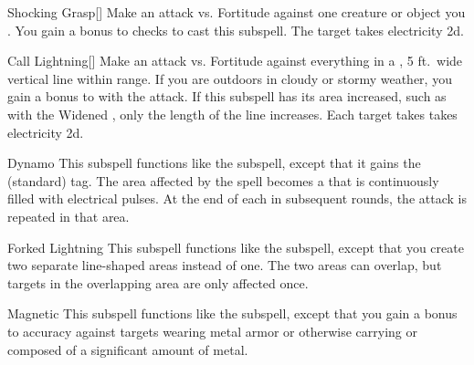 \begin{ability}[\nth{1}]{Shocking Grasp}[]
Make an attack vs. Fortitude against one creature or object you .
You gain a  bonus to  checks to cast this subspell.
\hit The target takes electricity  \plus2d.
\end{ability}
\vspace{0.25em}



\begin{ability}[\nth{2}]{Call Lightning}[]
Make an attack vs. Fortitude against everything in a \arealarge, 5 ft.\ wide vertical line within \rngmed range.
If you are outdoors in cloudy or stormy weather, you gain a  bonus to  with the attack.
If this subspell has its area increased, such as with the Widened , only the length of the line increases.
\hit Each target takes takes electricity  \plus2d.
\end{ability}
\vspace{0.25em}



\begin{ability}[\nth{2}]{Dynamo}
This subspell functions like the  subspell, except that it gains the  (standard) tag.
The area affected by the spell becomes a  that is continuously filled with electrical pulses.
At the end of each  in subsequent rounds, the attack is repeated in that area.
\end{ability}
\vspace{0.25em}



\begin{ability}[\nth{2}]{Forked Lightning}
This subspell functions like the  subspell, except that you create two separate line-shaped areas instead of one.
The two areas can overlap, but targets in the overlapping area are only affected once.
\end{ability}
\vspace{0.25em}



\begin{ability}[\nth{2}]{Magnetic}
This subspell functions like the  subspell, except that you gain a  bonus to accuracy against targets wearing metal armor or otherwise carrying or composed of a significant amount of metal.
\end{ability}
\vspace{0.25em}



